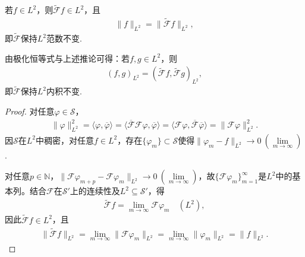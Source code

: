 \documentclass[../../main.tex]{subfiles}%
\begin{document}
\begin{corollary}
若$f\in L^2$，则$\widetilde{\mathscr{F}}f\in L^2$，且
\begin{align}
\|f\|_{L^2}=\|\widetilde{\mathscr{F}}f\|_{L^2},\label{eq:plancherel}
\end{align}
即$\widetilde{\mathscr{F}}$保持$L^2$范数不变.
\end{corollary}
\begin{remark}
由极化恒等式与上述推论可得：若$f,g\in L^2$，则
\begin{align}
(f,g)_{L^2}=(\widetilde{\mathscr{F}}f,\widetilde{\mathscr{F}}g)_{L^2},\label{eq:innerprodft}
\end{align}
即$\widetilde{\mathscr{F}}$保持$L^2$内积不变.
\end{remark}
\begin{proof}
对任意$\varphi\in\mathscr{S}$，
\begin{align*}
\|\varphi\|_{L^2}^2=\langle\varphi,\overline{\varphi}\rangle=\langle\overline{\mathscr{F}}\mathscr{F}\varphi,\overline{\varphi}\rangle=\langle\mathscr{F}\varphi,\overline{\mathscr{F}}\overline{\varphi}\rangle=\|\mathscr{F}\varphi\|_{L^2}^2.
\end{align*}
因$\mathscr{S}$在$L^2$中稠密，对任意$f\in L^2$，存在$\{\varphi_m\}\subset\mathscr{S}$使得$\|\varphi_m-f\|_{L^2}\to0\ (\lim\limits_{m\to\infty})$.

对任意$p\in\mathbb{N}$，$\|\mathscr{F}\varphi_{m+p}-\mathscr{F}\varphi_m\|_{L^2}\to0\ (\lim\limits_{m\to\infty})$，故$\{\mathscr{F}\varphi_m\}_{m=1}^\infty$是$L^2$中的基本列。结合$\mathscr{F}$在$\mathscr{S}'$上的连续性及$L^2\subseteq\mathscr{S}'$，得
\begin{align*}
\widetilde{\mathscr{F}}f=\lim\limits_{m\to\infty}\mathscr{F}\varphi_m\quad(L^2),
\end{align*}
因此$\widetilde{\mathscr{F}}f\in L^2$，且
\begin{align*}
\|\widetilde{\mathscr{F}}f\|_{L^2}=\lim\limits_{m\to\infty}\|\mathscr{F}\varphi_m\|_{L^2}=\lim\limits_{m\to\infty}\|\varphi_m\|_{L^2}=\|f\|_{L^2}.
\end{align*}
\end{proof}
\end{document}
